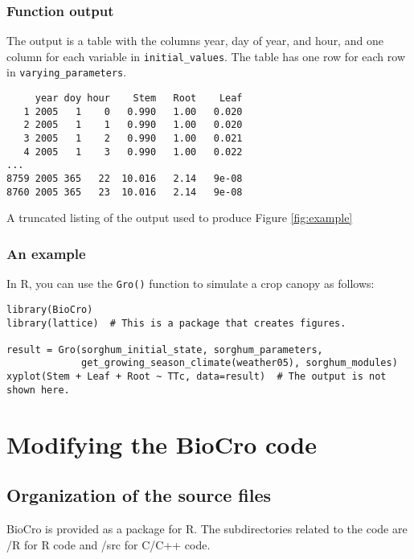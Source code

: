 \documentclass{article}
\newcommand{\code}[1]{\texttt{#1}}
\begin{document}
\subsubsection{Function output}
The output is a table with the columns year, day of year, and hour, and one column for each variable in \code{initial\_values}. The table has one row for each row in \code{varying\_parameters}.

\begin{table}[!htbp]
\begin{center}
\begin{lstlisting}
     year doy hour    Stem   Root    Leaf
   1 2005   1    0   0.990   1.00   0.020
   2 2005   1    1   0.990   1.00   0.020
   3 2005   1    2   0.990   1.00   0.021
   4 2005   1    3   0.990   1.00   0.022
...
8759 2005 365   22  10.016   2.14   9e-08
8760 2005 365   23  10.016   2.14   9e-08
\end{lstlisting}
\caption{\label{tab:example_output} A truncated listing of the output used to produce Figure \ref{fig:example}}
\end{center}
\end{table}

\subsubsection{An example}
In R, you can use the \code{Gro()} function to simulate a crop canopy as follows:
% 
% 
\begin{center}
\begin{lstlisting}
library(BioCro)
library(lattice)  # This is a package that creates figures.

result = Gro(sorghum_initial_state, sorghum_parameters,
             get_growing_season_climate(weather05), sorghum_modules)
xyplot(Stem + Leaf + Root ~ TTc, data=result)  # The output is not shown here.
\end{lstlisting}
\end{center}

\section{Modifying the BioCro code}
\subsection{Organization of the source files}
BioCro is provided as a package for R. The subdirectories related to the code are /R for R code and /src for C/C++ code.
\end{document}
